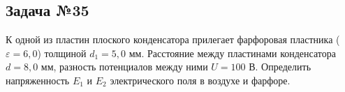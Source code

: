 \subsection{Задача №35}

К одной из пластин плоского конденсатора прилегает фарфоровая пластника ($\varepsilon=6,0$) толщиной $d_1=5,0$ мм. Расстояние между пластинами конденсатора $d=8,0$ мм, разность потенциалов между ними $U=100$ В. Определить напряженность $E_1$ и $E_2$ электрического поля в воздухе и фарфоре.